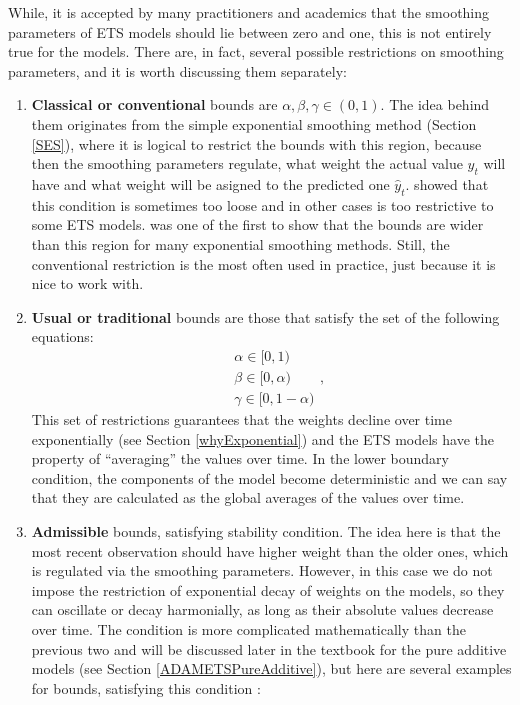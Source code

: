 \documentclass[
]{book}
\theoremstyle{definition}
\theoremstyle{definition}
\theoremstyle{definition}
\theoremstyle{definition}
\theoremstyle{remark}
\begin{document}
While, it is accepted by many practitioners and academics that the smoothing parameters of ETS models should lie between zero and one, this is not entirely true for the models. There are, in fact, several possible restrictions on smoothing parameters, and it is worth discussing them separately:

\begin{enumerate}
\def\labelenumi{\arabic{enumi}.}
\item
  \textbf{Classical or conventional} bounds are \(\alpha, \beta, \gamma \in (0,1)\). The idea behind them originates from the simple exponential smoothing method (Section \ref{SES}), where it is logical to restrict the bounds with this region, because then the smoothing parameters regulate, what weight the actual value \(y_t\) will have and what weight will be asigned to the predicted one \(\hat{y}_t\). \citet{Hyndman2008b} showed that this condition is sometimes too loose and in other cases is too restrictive to some ETS models. \citet{Brenner1968} was one of the first to show that the bounds are wider than this region for many exponential smoothing methods. Still, the conventional restriction is the most often used in practice, just because it is nice to work with.
\item
  \textbf{Usual or traditional} bounds are those that satisfy the set of the following equations:
  \begin{equation}
    \begin{aligned}
    &\alpha \in [0, 1)\\
    &\beta \in [0, \alpha) \\
    &\gamma \in [0, 1-\alpha)
    \end{aligned},
    \label{eq:ETSUsualBounds}
  \end{equation}
  This set of restrictions guarantees that the weights decline over time exponentially (see Section \ref{whyExponential}) and the ETS models have the property of ``averaging'' the values over time. In the lower boundary condition, the components of the model become deterministic and we can say that they are calculated as the global averages of the values over time.
\item
  \textbf{Admissible} bounds, satisfying stability condition. The idea here is that the most recent observation should have higher weight than the older ones, which is regulated via the smoothing parameters. However, in this case we do not impose the restriction of exponential decay of weights on the models, so they can oscillate or decay harmonially, as long as their absolute values decrease over time. The condition is more complicated mathematically than the previous two and will be discussed later in the textbook for the pure additive models (see Section \ref{ADAMETSPureAdditive}), but here are several examples for bounds, satisfying this condition \citep[from Chapter 10 of][]{Hyndman2008b}:
\end{enumerate}
\end{document}
